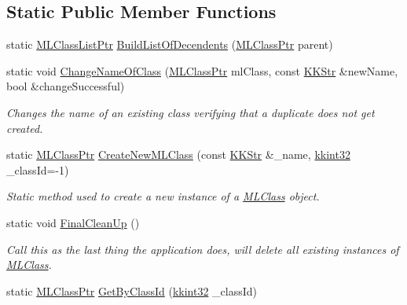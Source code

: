 \subsection*{Static Public Member Functions}
\begin{DoxyCompactItemize}
\item 
static \hyperlink{namespace_k_k_m_l_l_af091cde3f4a4315658b41a5e7583fc26}{M\+L\+Class\+List\+Ptr} \hyperlink{class_k_k_m_l_l_1_1_m_l_class_a079a92f06b013c1acfa05b39e4820b06}{Build\+List\+Of\+Decendents} (\hyperlink{namespace_k_k_m_l_l_ac272393853d59e72e8456f14cd6d8c23}{M\+L\+Class\+Ptr} parent)
\item 
static void \hyperlink{class_k_k_m_l_l_1_1_m_l_class_a2885489e8302599095be4c317870ab5b}{Change\+Name\+Of\+Class} (\hyperlink{namespace_k_k_m_l_l_ac272393853d59e72e8456f14cd6d8c23}{M\+L\+Class\+Ptr} ml\+Class, const \hyperlink{class_k_k_b_1_1_k_k_str}{K\+K\+Str} \&new\+Name, bool \&change\+Successful)
\begin{DoxyCompactList}\small\item\em Changes the name of an existing class verifying that a duplicate does not get created. \end{DoxyCompactList}\item 
static \hyperlink{namespace_k_k_m_l_l_ac272393853d59e72e8456f14cd6d8c23}{M\+L\+Class\+Ptr} \hyperlink{class_k_k_m_l_l_1_1_m_l_class_a9fd24c617c42d89afc92414575e00e9a}{Create\+New\+M\+L\+Class} (const \hyperlink{class_k_k_b_1_1_k_k_str}{K\+K\+Str} \&\+\_\+name, \hyperlink{namespace_k_k_b_a8fa4952cc84fda1de4bec1fbdd8d5b1b}{kkint32} \+\_\+class\+Id=-\/1)
\begin{DoxyCompactList}\small\item\em Static method used to create a new instance of a \hyperlink{class_k_k_m_l_l_1_1_m_l_class}{M\+L\+Class} object. \end{DoxyCompactList}\item 
static void \hyperlink{class_k_k_m_l_l_1_1_m_l_class_afd188f139ffde66f4da7faed7bddc165}{Final\+Clean\+Up} ()
\begin{DoxyCompactList}\small\item\em Call this as the last thing the application does, will delete all existing instances of \textquotesingle{}\hyperlink{class_k_k_m_l_l_1_1_m_l_class}{M\+L\+Class}\textquotesingle{}. \end{DoxyCompactList}\item 
static \hyperlink{namespace_k_k_m_l_l_ac272393853d59e72e8456f14cd6d8c23}{M\+L\+Class\+Ptr} \hyperlink{class_k_k_m_l_l_1_1_m_l_class_af78d53d02a454a10a0a278299afbac45}{Get\+By\+Class\+Id} (\hyperlink{namespace_k_k_b_a8fa4952cc84fda1de4bec1fbdd8d5b1b}{kkint32} \+\_\+class\+Id)

\end{DoxyCompactItemize}
